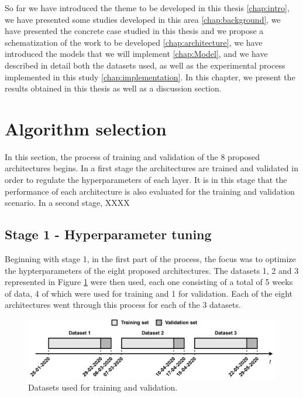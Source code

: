 \cleardoublepage
\label{chap:results}

So far we have introduced the theme to be developed in this thesis \ref{chap:intro}, we have presented some studies developed in this area \ref{chap:background}, we have presented the concrete case studied in this thesis and we propose a schematization of the work to be developed \ref{chap:architecture}, we have introduced the models that we will implement \ref{chap:Model}, and we have described in detail both the datasets used, as well as the experimental process implemented in this study \ref{chap:implementation}. In this chapter, we present the results obtained in this thesis as well as a discussion section.


\section{Algorithm selection} \label{chap5:framework}

In this section, the process of training and validation of the 8 proposed architectures begins. In a first stage the architectures are trained and validated in order to regulate the hyperparameters of each layer. It is in this stage that the performance of each architecture is also evaluated for the training and validation scenario. In a second stage, XXXX


\subsection{Stage 1 - Hyperparameter tuning}\label{sec:part1}
Beginning with stage 1, in the first part of the process, the focus was to optimize the hypterparameters of the eight proposed architectures. The datasets 1, 2 and 3 represented in Figure \ref{hyptun} were then used, each one consisting of a total of 5 weeks of data, 4 of which were used for training and 1 for validation. Each of the eight architectures went through this process for each of the 3 datasets.  

\begin{figure}[h!]
    \centering
    \begin{center}
    \includegraphics[width=1\textwidth]{Images/hyptun.png}
    \caption{Datasets used for training and validation.}
    \label{hyptun}
    \end{center}
\end{figure}


